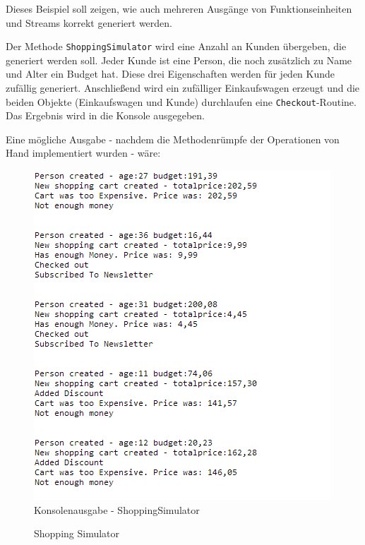 Dieses Beispiel soll zeigen, wie auch mehreren Ausgänge von Funktionseinheiten und Streams korrekt generiert werden.

Der Methode \texttt{ShoppingSimulator} wird eine Anzahl an Kunden übergeben, die generiert werden soll.
Jeder Kunde ist eine Person, die noch zusätzlich zu Name und Alter ein Budget hat.
Diese drei Eigenschaften werden für jeden Kunde zufällig generiert.
Anschließend wird ein zufälliger Einkaufswagen erzeugt und die beiden Objekte (Einkaufswagen und Kunde) durchlaufen eine \texttt{Checkout}-Routine.
Das Ergebnis wird in die Konsole ausgegeben.

Eine mögliche Ausgabe - nachdem die Methodenrümpfe der Operationen von Hand implementiert wurden - wäre:
\begin{figure}[H]
	\centering
	\includegraphics[width=0.7\linewidth]{./img/ShoppingSimulator_result.png}
	\caption{Konsolenausgabe - ShoppingSimulator}
\end{figure}



\begin{landscape}
	\begin{figure}
		\thispagestyle{empty}
		\vspace*{-1.5cm}
		\hspace*{-2cm}
		
		\caption{Shopping Simulator}
	\end{figure}
\end{landscape}




